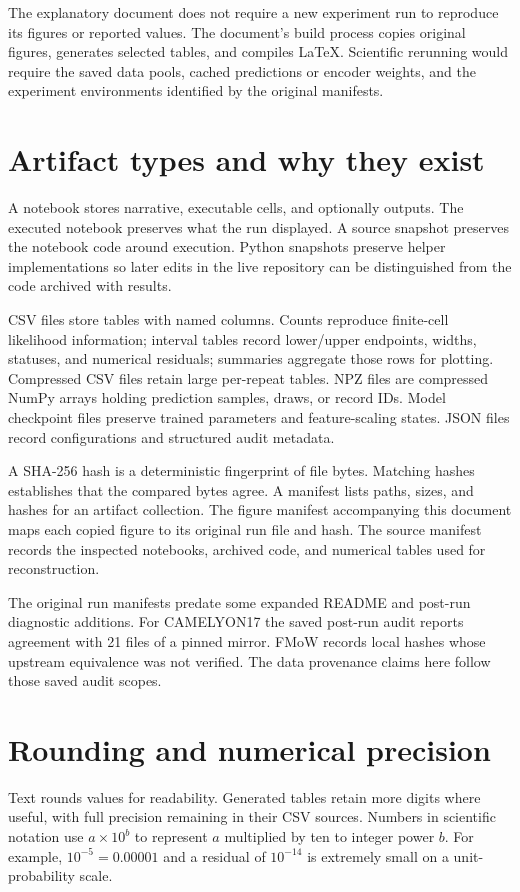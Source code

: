 \documentclass[11pt,a4paper]{report}
\begin{document}
The explanatory document does not require a new experiment run to reproduce its figures or reported values. The document's build process copies original figures, generates selected tables, and compiles LaTeX. Scientific rerunning would require the saved data pools, cached predictions or encoder weights, and the experiment environments identified by the original manifests.

\section{Artifact types and why they exist}
A notebook stores narrative, executable cells, and optionally outputs. The executed notebook preserves what the run displayed. A source snapshot preserves the notebook code around execution. Python snapshots preserve helper implementations so later edits in the live repository can be distinguished from the code archived with results.

CSV files store tables with named columns. Counts reproduce finite-cell likelihood information; interval tables record lower/upper endpoints, widths, statuses, and numerical residuals; summaries aggregate those rows for plotting. Compressed CSV files retain large per-repeat tables. NPZ files are compressed NumPy arrays holding prediction samples, draws, or record IDs. Model checkpoint files preserve trained parameters and feature-scaling states. JSON files record configurations and structured audit metadata.

A SHA-256 hash is a deterministic fingerprint of file bytes. Matching hashes establishes that the compared bytes agree. A manifest lists paths, sizes, and hashes for an artifact collection. The figure manifest accompanying this document maps each copied figure to its original run file and hash. The source manifest records the inspected notebooks, archived code, and numerical tables used for reconstruction.

The original run manifests predate some expanded README and post-run diagnostic additions. For CAMELYON17 the saved post-run audit reports agreement with 21 files of a pinned mirror. FMoW records local hashes whose upstream equivalence was not verified. The data provenance claims here follow those saved audit scopes.

\section{Rounding and numerical precision}
Text rounds values for readability. Generated tables retain more digits where useful, with full precision remaining in their CSV sources. Numbers in scientific notation use $a\times10^b$ to represent $a$ multiplied by ten to integer power $b$. For example, $10^{-5}=0.00001$ and a residual of $10^{-14}$ is extremely small on a unit-probability scale.
\end{document}
